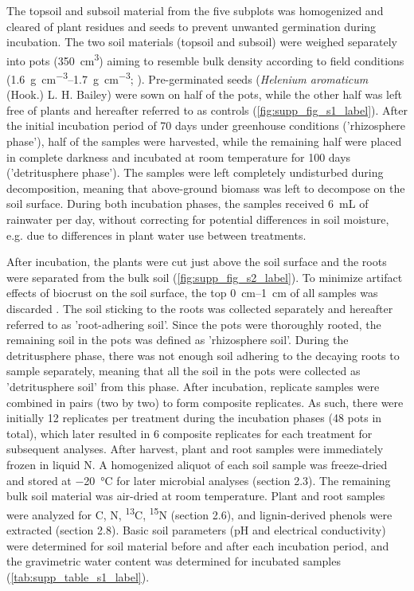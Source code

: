 The topsoil and subsoil material from the five subplots was homogenized and cleared of plant residues and seeds to prevent unwanted germination during incubation. The two soil materials (topsoil and subsoil) were weighed separately into pots (\SI{350}{\centi\metre\cubed}) aiming to resemble bulk density according to field conditions (\SIrange{1.6}{1.7}{\gram\per\centi\metre\cubed}; \citealp{Bernhard2018}). Pre-germinated seeds (\textit{Helenium aromaticum} (Hook.) L. H. Bailey) were sown on half of the pots, while the other half was left free of plants and hereafter referred to as controls (\cref{fig:supp_fig_s1_label}). After the initial incubation period of 70 days under greenhouse conditions ('rhizosphere phase'), half of the samples were harvested, while the remaining half were placed in complete darkness and incubated at room temperature for 100 days ('detritusphere phase'). The samples were left completely undisturbed during decomposition, meaning that above-ground biomass was left to decompose on the soil surface. During both incubation phases, the samples received \SI{6}{\milli\liter} of rainwater per day, without correcting for potential differences in soil moisture, e.g. due to differences in plant water use between treatments.

After incubation, the plants were cut just above the soil surface and the roots were separated from the bulk soil (\cref{fig:supp_fig_s2_label}). To minimize artifact effects of biocrust on the soil surface, the top \SIrange{0}{1}{\centi\metre} of all samples was discarded \citep{Weber2022}. The soil sticking to the roots was collected separately and hereafter referred to as 'root-adhering soil'. Since the pots were thoroughly rooted, the remaining soil in the pots was defined as 'rhizosphere soil'. During the detritusphere phase, there was not enough soil adhering to the decaying roots to sample separately, meaning that all the soil in the pots were collected as 'detritusphere soil' from this phase. After incubation, replicate samples were combined in pairs (two by two) to form composite replicates. As such, there were initially 12 replicates per treatment during the incubation phases (48 pots in total), which later resulted in 6 composite replicates for each treatment for subsequent analyses. After harvest, plant and root samples were immediately frozen in liquid N. A homogenized aliquot of each soil sample was freeze-dried and stored at \SI{-20}{\degreeCelsius} for later microbial analyses (section 2.3). The remaining bulk soil material was air-dried at room temperature. Plant and root samples were analyzed for C, N, \textsuperscript{13}C, \textsuperscript{15}N (section 2.6), and lignin-derived phenols were extracted (section 2.8). Basic soil parameters (pH and electrical conductivity) were determined for soil material before and after each incubation period, and the gravimetric water content was determined for incubated samples (\cref{tab:supp_table_s1_label}).

